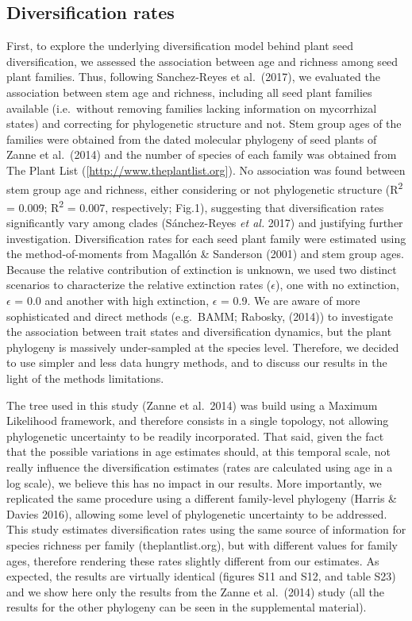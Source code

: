 \documentclass[12pt,]{article}
\begin{document}
\hypertarget{diversification-rates}{%
\subsection{Diversification rates}\label{diversification-rates}}

First, to explore the underlying diversification model behind plant seed
diversification, we assessed the association between age and richness
among seed plant families. Thus, following Sanchez-Reyes et al.~(2017),
we evaluated the association between stem age and richness, including
all seed plant families available (i.e.~without removing families
lacking information on mycorrhizal states) and correcting for
phylogenetic structure and not. Stem group ages of the families were
obtained from the dated molecular phylogeny of seed plants of Zanne et
al.~(2014) and the number of species of each family was obtained from
The Plant List ({[}\url{http://www.theplantlist.org}{]}). No association
was found between stem group age and richness, either considering or not
phylogenetic structure (R\textsuperscript{2} = 0.009;
R\textsuperscript{2} = 0.007, respectively; Fig.1), suggesting that
diversification rates significantly vary among clades (Sánchez-Reyes
\emph{et al.} 2017) and justifying further investigation.
Diversification rates for each seed plant family were estimated using
the method-of-moments from Magallón \& Sanderson (2001) and stem group
ages. Because the relative contribution of extinction is unknown, we
used two distinct scenarios to characterize the relative extinction
rates (\(\epsilon\)), one with no extinction, \(\epsilon\) = 0.0 and
another with high extinction, \(\epsilon\) = 0.9. We are aware of more
sophisticated and direct methods (e.g.~BAMM; Rabosky, (2014)) to
investigate the association between trait states and diversification
dynamics, but the plant phylogeny is massively under-sampled at the
species level. Therefore, we decided to use simpler and less data hungry
methods, and to discuss our results in the light of the methods
limitations.

The tree used in this study (Zanne et al.~2014) was build using a
Maximum Likelihood framework, and therefore consists in a single
topology, not allowing phylogenetic uncertainty to be readily
incorporated. That said, given the fact that the possible variations in
age estimates should, at this temporal scale, not really influence the
diversification estimates (rates are calculated using age in a log
scale), we believe this has no impact in our results. More importantly,
we replicated the same procedure using a different family-level
phylogeny (Harris \& Davies 2016), allowing some level of phylogenetic
uncertainty to be addressed. This study estimates diversification rates
using the same source of information for species richness per family
(theplantlist.org), but with different values for family ages, therefore
rendering these rates slightly different from our estimates. As
expected, the results are virtually identical (figures S11 and S12, and
table S23) and we show here only the results from the Zanne et
al.~(2014) study (all the results for the other phylogeny can be seen in
the supplemental material).
\end{document}
